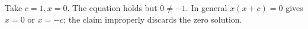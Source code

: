 Take $c=1,x=0$. The equation holds but $0\ne-1$. In general $x(x+c)=0$ gives $x=0$ or $x=-c$; the claim improperly discards the zero solution.
